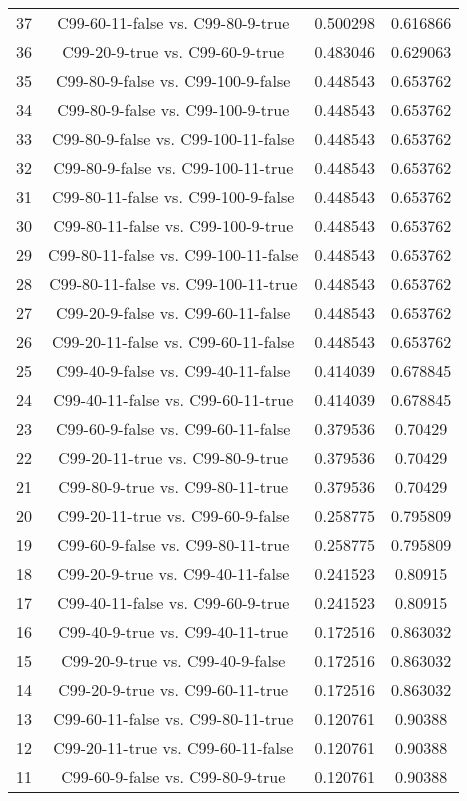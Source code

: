 \documentclass[a4paper,10pt]{article}
\begin{document}
\begin{landscape}
\begin{table}[!htp]
\begin{tabular}{cccc}
37&C99-60-11-false vs. C99-80-9-true&0.500298&0.616866\\
36&C99-20-9-true vs. C99-60-9-true&0.483046&0.629063\\
35&C99-80-9-false vs. C99-100-9-false&0.448543&0.653762\\
34&C99-80-9-false vs. C99-100-9-true&0.448543&0.653762\\
33&C99-80-9-false vs. C99-100-11-false&0.448543&0.653762\\
32&C99-80-9-false vs. C99-100-11-true&0.448543&0.653762\\
31&C99-80-11-false vs. C99-100-9-false&0.448543&0.653762\\
30&C99-80-11-false vs. C99-100-9-true&0.448543&0.653762\\
29&C99-80-11-false vs. C99-100-11-false&0.448543&0.653762\\
28&C99-80-11-false vs. C99-100-11-true&0.448543&0.653762\\
27&C99-20-9-false vs. C99-60-11-false&0.448543&0.653762\\
26&C99-20-11-false vs. C99-60-11-false&0.448543&0.653762\\
25&C99-40-9-false vs. C99-40-11-false&0.414039&0.678845\\
24&C99-40-11-false vs. C99-60-11-true&0.414039&0.678845\\
23&C99-60-9-false vs. C99-60-11-false&0.379536&0.70429\\
22&C99-20-11-true vs. C99-80-9-true&0.379536&0.70429\\
21&C99-80-9-true vs. C99-80-11-true&0.379536&0.70429\\
20&C99-20-11-true vs. C99-60-9-false&0.258775&0.795809\\
19&C99-60-9-false vs. C99-80-11-true&0.258775&0.795809\\
18&C99-20-9-true vs. C99-40-11-false&0.241523&0.80915\\
17&C99-40-11-false vs. C99-60-9-true&0.241523&0.80915\\
16&C99-40-9-true vs. C99-40-11-true&0.172516&0.863032\\
15&C99-20-9-true vs. C99-40-9-false&0.172516&0.863032\\
14&C99-20-9-true vs. C99-60-11-true&0.172516&0.863032\\
13&C99-60-11-false vs. C99-80-11-true&0.120761&0.90388\\
12&C99-20-11-true vs. C99-60-11-false&0.120761&0.90388\\
11&C99-60-9-false vs. C99-80-9-true&0.120761&0.90388\\

\end{tabular}
\end{table}
\end{landscape}
\end{document}
